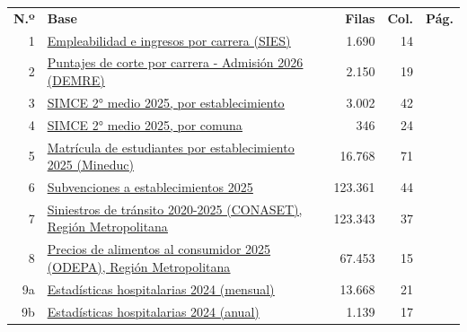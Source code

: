 \documentclass[10.5pt]{article}
\begin{document}
\hypertarget{indice}{}
\begin{formulabox}
\begin{tabularx}{\linewidth}{@{}r X r r r@{}}
\textbf{N.º} & \textbf{Base} & \textbf{Filas} & \textbf{Col.} & \textbf{Pág.} \\
1 & \hyperlink{base1}{\textcolor{azuloscuro}{\underline{Empleabilidad e ingresos por carrera (SIES)}}} & 1.690 & 14 & \pageref{base1} \\
2 & \hyperlink{base2}{\textcolor{azuloscuro}{\underline{Puntajes de corte por carrera - Admisión 2026 (DEMRE)}}} & 2.150 & 19 & \pageref{base2} \\
3 & \hyperlink{base3}{\textcolor{azuloscuro}{\underline{SIMCE 2° medio 2025, por establecimiento}}} & 3.002 & 42 & \pageref{base3} \\
4 & \hyperlink{base4}{\textcolor{azuloscuro}{\underline{SIMCE 2° medio 2025, por comuna}}} & 346 & 24 & \pageref{base4} \\
5 & \hyperlink{base5}{\textcolor{azuloscuro}{\underline{Matrícula de estudiantes por establecimiento 2025 (Mineduc)}}} & 16.768 & 71 & \pageref{base5} \\
6 & \hyperlink{base6}{\textcolor{azuloscuro}{\underline{Subvenciones a establecimientos 2025}}} & 123.361 & 44 & \pageref{base6} \\
7 & \hyperlink{base7}{\textcolor{azuloscuro}{\underline{Siniestros de tránsito 2020-2025 (CONASET), Región Metropolitana}}} & 123.343 & 37 & \pageref{base7} \\
8 & \hyperlink{base8}{\textcolor{azuloscuro}{\underline{Precios de alimentos al consumidor 2025 (ODEPA), Región Metropolitana}}} & 67.453 & 15 & \pageref{base8} \\
9a & \hyperlink{base9a}{\textcolor{azuloscuro}{\underline{Estadísticas hospitalarias 2024 (mensual)}}} & 13.668 & 21 & \pageref{base9a} \\
9b & \hyperlink{base9b}{\textcolor{azuloscuro}{\underline{Estadísticas hospitalarias 2024 (anual)}}} & 1.139 & 17 & \pageref{base9b} \\
\end{tabularx}
\end{formulabox}
\end{document}
